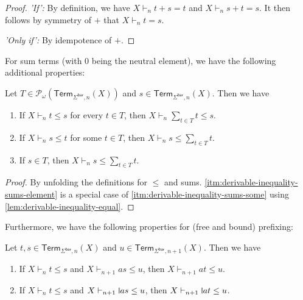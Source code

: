 \documentclass[a4paper,UKenglish,cleveref,thm-restate,numberwithinsect,final]{lipics-v2021}
\newcommand{\Br}{\mathsf{bar}}
\newcommand{\Term}{\mathsf{Term}}
\newcommand{\pow}{\mathcal{P}}
\newcommand{\powf}{\pow_{\omega}}
\theoremstyle{plain}
\newcommand{\midmid}{\hspace{0.2ex}{\rule[-0.1ex]{0.6pt}{1.65ex}}\hspace{0.2ex}}
\newcommand{\newletter}[1]{{\midmid}#1}
\numberwithin{equation}{section}
\newcommand{\+}[1]{\mathcal{#1}\xspace}
\theoremstyle{definition}
\begin{document}
\begin{proof}
  \emph{'If':}
  By definition, we have \(X \vdash_n t + s = t\) and \(X \vdash_n s + t = s\).
  It then follows by symmetry of \(+\) that \(X \vdash_n t = s\).

  \noindent\emph{'Only if':}
  By idempotence of \(+\).

\end{proof}

For sum terms (with \(0\) being the neutral element), we have the following additional properties:

\begin{lemma}\label{lem:derivable-inequality-sums}
  Let \(T \in \powf(\Term_{\Sigma^\Br, n}(X))\) and \(s \in \Term_{\Sigma^\Br, n}(X)\). Then we have
  \begin{enumerate}
    \item\label{itm:derivable-inequality-sums-all}
      If \(X \vdash_n t \le s\) for every \(t \in T\), then \(X \vdash_n \sum_{t \in T} t \le s\).
    \item\label{itm:derivable-inequality-sums-some}
      If \(X \vdash_n s \le t\) for some \(t \in T\), then \(X \vdash_n s \le \sum_{t \in T} t\).
    \item\label{itm:derivable-inequality-sums-element}
      If \(s \in T\), then \(X \vdash_n s \le \sum_{t \in T} t\).
  \end{enumerate}
\end{lemma}

\begin{proof}
  By unfolding the definitions for \(\le\) and sums. \eqref{itm:derivable-inequality-sums-element} is a special case of \eqref{itm:derivable-inequality-sums-some} using \cref{lem:derivable-inequality-equal}.
\end{proof}

Furthermore, we have the following properties for (free and bound) prefixing:

\begin{lemma}\label{lem:derivable-inequality-prefix}
  Let \(t, s \in \Term_{\Sigma^\Br, n}(X)\) and \(u \in \Term_{\Sigma^\Br, n + 1}(X)\). Then we have
  \begin{enumerate}
    \item If \(X \vdash_n t \le s\) and \(X \vdash_{n + 1} as \le u\), then \(X \vdash_{n + 1} at \le u\).
    \item If \(X \vdash_n t \le s\) and \(X \vdash_{n + 1} \newletter{a}s \le u\), then \(X \vdash_{n + 1} \newletter{a}t \le u\).
  \end{enumerate}
\end{lemma}
\end{document}
